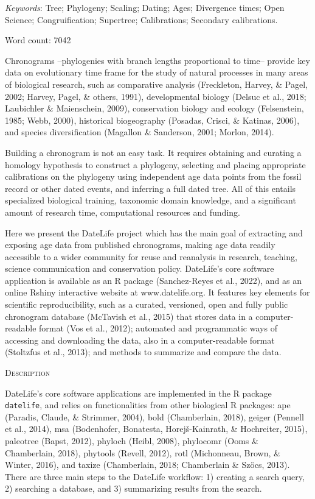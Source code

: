 \documentclass[english,man]{apa6}
\begin{document}
\emph{Keywords}: Tree; Phylogeny; Scaling; Dating; Ages; Divergence times; Open Science; Congruification; Supertree; Calibrations; Secondary calibrations.

Word count: 7042

\newpage

Chronograms --phylogenies with branch lengths proportional to time-- provide key data on evolutionary time frame for the study of natural processes in many areas of biological research, such as comparative analysis (Freckleton, Harvey, \& Pagel, 2002; Harvey, Pagel, \& others, 1991), developmental biology (Delsuc et al., 2018; Laubichler \& Maienschein, 2009), conservation biology and ecology (Felsenstein, 1985; Webb, 2000), historical biogeography (Posadas, Crisci, \& Katinas, 2006), and species diversification (Magallon \& Sanderson, 2001; Morlon, 2014).

Building a chronogram is not an easy task.
It requires obtaining and curating a homology hypothesis to construct a phylogeny, selecting and placing appropriate calibrations on the phylogeny using independent age data points from the fossil record or other dated events, and inferring a full dated tree. All of this entails specialized biological training, taxonomic domain knowledge, and a significant amount of research time, computational resources and funding.

Here we present the DateLife project which has the main goal of extracting and exposing age data from published chronograms, making age data readily accessible to a wider community for reuse and reanalysis in research, teaching, science communication and conservation policy.
DateLife's core software application is available as an R package (Sanchez-Reyes et al., 2022), and as an online Rshiny interactive website at www.datelife.org. It features key elements for scientific reproducibility, such as a curated, versioned, open and fully public chronogram database (McTavish et al., 2015) that stores data in a computer-readable format (Vos et al., 2012); automated and programmatic ways of accessing and downloading the data, also in a computer-readable format (Stoltzfus et al., 2013); and methods to summarize and compare the data.

\begin{center}
\textsc{Description}
\end{center}

DateLife's core software applications are implemented in the R package \texttt{datelife},
and relies on functionalities from other biological R packages:
ape (Paradis, Claude, \& Strimmer, 2004),
bold (Chamberlain, 2018),
geiger (Pennell et al., 2014),
msa (Bodenhofer, Bonatesta, Horejš-Kainrath, \& Hochreiter, 2015),
paleotree (Bapst, 2012),
phyloch (Heibl, 2008),
phylocomr (Ooms \& Chamberlain, 2018),
phytools (Revell, 2012),
rotl (Michonneau, Brown, \& Winter, 2016), and
taxize (Chamberlain, 2018; Chamberlain \& Szöcs, 2013).
There are three main steps to the DateLife workflow: 1) creating a search query, 2) searching a database, and 3) summarizing results from the search.
\end{document}
